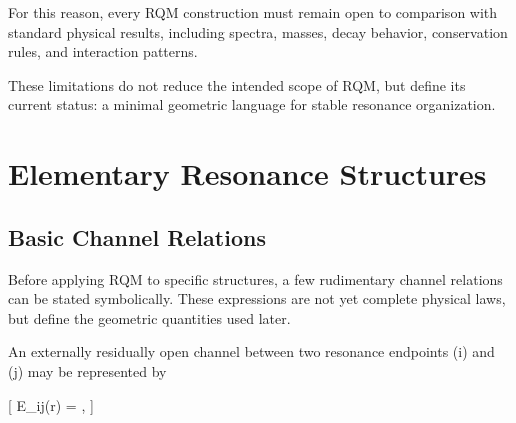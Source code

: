 \documentclass[11pt,a4paper]{article}
\begin{document}
For this reason, every RQM construction must remain open to comparison with standard physical results, including spectra, masses, decay behavior, conservation rules, and interaction patterns.

These limitations do not reduce the intended scope of RQM, but define its current status: a minimal geometric language for stable resonance organization.



\section{Elementary Resonance Structures}



\subsection{Basic Channel Relations}

Before applying RQM to specific structures, a few rudimentary channel relations can be stated symbolically. These expressions are not yet complete physical laws, but define the geometric quantities used later.

An externally residually open channel between two resonance endpoints (i) and (j) may be represented by

[
E_{ij}(r) = ,
]
\end{document}
